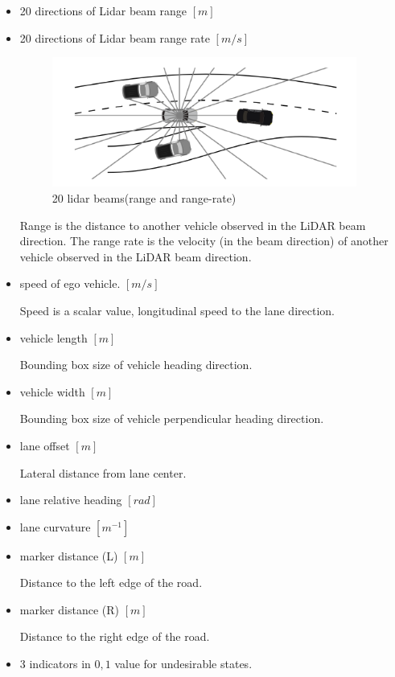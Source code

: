 \begin{itemize}
\item 20 directions of Lidar beam range $[m]$
\item 20 directions of Lidar beam range rate $[m/s]$

\begin{figure}[H]
\begin{center}
\includegraphics[width=10cm]{./figures/lidar_beam.png}
\caption{20 lidar beams(range and range-rate)}
\label{fig:lidar_beam}
\end{center}
\end{figure}

Range is the distance to another vehicle observed in the LiDAR beam direction.
The range rate is the velocity (in the beam direction) of another vehicle observed in the LiDAR beam direction.

\item speed of ego vehicle. $[m/s]$

Speed is a scalar value, longitudinal speed to the lane direction.

\item vehicle length $[m]$

Bounding box size of vehicle heading direction.

\item vehicle width $[m]$

Bounding box size of vehicle perpendicular heading direction.

\item lane offset $[m]$

Lateral distance from lane center.

\item lane relative heading $[rad]$
\item lane curvature $[m^{-1}]$
\item marker distance (L) $[m]$

Distance to the left edge of the road.

\item marker distance (R) $[m]$

Distance to the right edge of the road.

\item 3 indicators in ${0, 1}$ value for undesirable  states.
\end{itemize}

